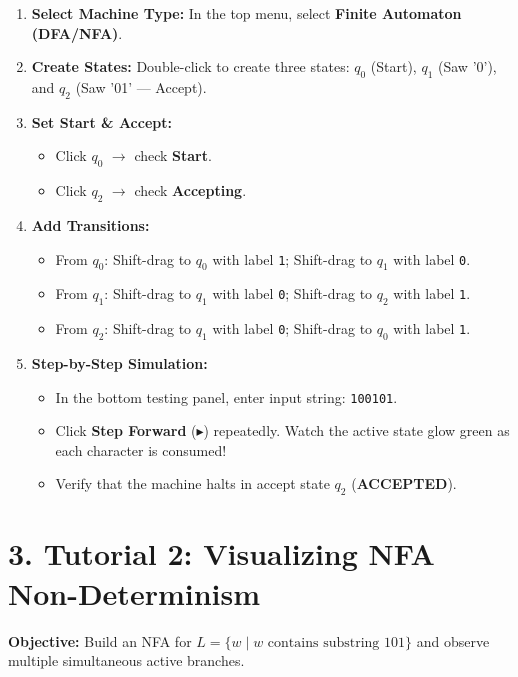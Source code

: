 \documentclass[11pt,a4paper]{article}
\begin{document}
\begin{enumerate}[leftmargin=1.5em, itemsep=4pt]
    \item \textbf{Select Machine Type:} In the top menu, select \textbf{Finite Automaton (DFA/NFA)}.
    \item \textbf{Create States:} Double-click to create three states: $q_0$ (Start), $q_1$ (Saw '0'), and $q_2$ (Saw '01' --- Accept).
    \item \textbf{Set Start \& Accept:}
    \begin{itemize}
        \item Click $q_0$ $\to$ check \textbf{Start}.
        \item Click $q_2$ $\to$ check \textbf{Accepting}.
    \end{itemize}
    \item \textbf{Add Transitions:}
    \begin{itemize}
        \item From $q_0$: Shift-drag to $q_0$ with label \texttt{1}; Shift-drag to $q_1$ with label \texttt{0}.
        \item From $q_1$: Shift-drag to $q_1$ with label \texttt{0}; Shift-drag to $q_2$ with label \texttt{1}.
        \item From $q_2$: Shift-drag to $q_1$ with label \texttt{0}; Shift-drag to $q_0$ with label \texttt{1}.
    \end{itemize}
    \item \textbf{Step-by-Step Simulation:}
    \begin{itemize}
        \item In the bottom testing panel, enter input string: \texttt{100101}.
        \item Click \textbf{Step Forward} ($\blacktriangleright$) repeatedly. Watch the active state glow green as each character is consumed!
        \item Verify that the machine halts in accept state $q_2$ (\textbf{ACCEPTED}).
    \end{itemize}
\end{enumerate}

\newpage

\section*{3. Tutorial 2: Visualizing NFA Non-Determinism}
\textbf{Objective:} Build an NFA for $L = \{w \mid w \text{ contains substring } 101\}$ and observe multiple simultaneous active branches.
\end{document}
